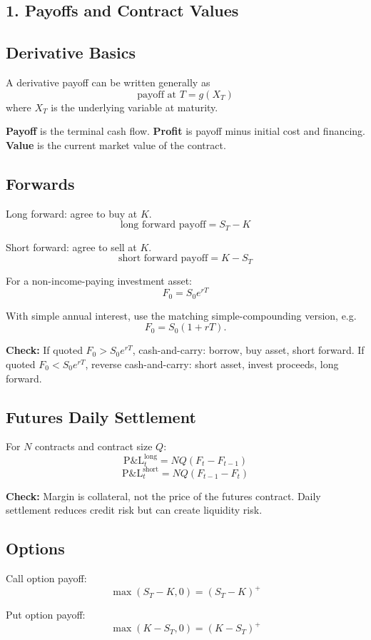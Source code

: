 \documentclass[10pt]{article}
\newcommand{\pnl}{\mathrm{P\&L}}
\newcommand{\formula}[1]{\[
    \boxed{\displaystyle #1}
\]}
\newcommand{\note}[1]{\textcolor{accent}{\textbf{Check:}} #1}
\begin{document}
\begin{multicols}{2}
\section*{1. Payoffs and Contract Values}

\subsection*{Derivative Basics}
A derivative payoff can be written generally as
\formula{\text{payoff at }T=g(X_T)}
where $X_T$ is the underlying variable at maturity.

\textbf{Payoff} is the terminal cash flow. \textbf{Profit} is payoff minus initial cost and financing. \textbf{Value} is the current market value of the contract.

\subsection*{Forwards}
Long forward: agree to buy at $K$.
\formula{\text{long forward payoff}=S_T-K}

Short forward: agree to sell at $K$.
\formula{\text{short forward payoff}=K-S_T}

For a non-income-paying investment asset:
\formula{F_0=S_0e^{rT}}

With simple annual interest, use the matching simple-compounding version, e.g.
\[
    F_0=S_0(1+rT).
\]

\note{If quoted $F_0>S_0e^{rT}$, cash-and-carry: borrow, buy asset, short forward. If quoted $F_0<S_0e^{rT}$, reverse cash-and-carry: short asset, invest proceeds, long forward.}

\subsection*{Futures Daily Settlement}
For $N$ contracts and contract size $Q$:
\formula{\pnl_t^{\text{long}}=NQ(F_t-F_{t-1})}
\formula{\pnl_t^{\text{short}}=NQ(F_{t-1}-F_t)}

\note{Margin is collateral, not the price of the futures contract. Daily settlement reduces credit risk but can create liquidity risk.}

\subsection*{Options}
Call option payoff:
\formula{\max(S_T-K,0)=(S_T-K)^+}

Put option payoff:
\formula{\max(K-S_T,0)=(K-S_T)^+}


\end{multicols}
\end{document}
